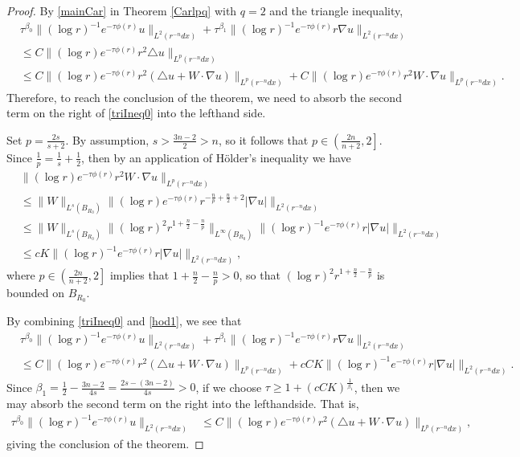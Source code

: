 \documentclass[11pt]{amsart}
\theoremstyle{plain}
\numberwithin{equation}{section}
\begin{document}
\begin{proof}
By \eqref{mainCar} in Theorem \ref{Carlpq} with $q = 2$ and the triangle inequality,
\begin{align}
&\tau^{{\beta}_0} \|(\log r)^{-1} e^{-\tau \phi(r)}u\|_{L^2(r^{-n}dx)}
+\tau^{{\beta}_1} \|(\log r )^{-1} e^{-\tau \phi(r)}r \nabla u\|_{L^2(r^{-n}dx)} \nonumber \\
&\leq  C \|(\log r ) e^{-\tau \phi(r)} r^2 \triangle u\|_{L^p(r^{-n} dx)}  \nonumber \\
&\le C\|(\log r) e^{-\tau \phi(r)} r^2 (\triangle u+ W\cdot \nabla u)\|_{L^p(r^{-n} dx)}
+ C\|(\log r) e^{-\tau \phi(r)} r^2 W\cdot \nabla u \|_{L^p(r^{-n} dx)}.
\label{triIneq0}
\end{align}
Therefore, to reach the conclusion of the theorem, we need to absorb the second term on the right of \eqref{triIneq0} into the lefthand side.

Set $p = \frac{2s}{s+2}$.
By assumption, $s > \frac{3n-2}{2} > n$, so it follows that $p \in {\left( {\frac{2n}{n+2}, 2} \right] }$.
Since $\frac{1}{p}=\frac{1}{s}+\frac{1}{2}$, then by an application of H\"older's inequality we have
\begin{align}
&\|(\log r) e^{-\tau\phi(r)} r^2 W\cdot\nabla u\|_{L^p(r^{-n} dx)} \nonumber \\
&\le  \|W\|_{L^{s}{\left( {B_{R_0}} \right) }} \|(\log r) e^{-\tau \phi(r)} r^{-\frac{n}{p}+\frac{n}{2}+2}|\nabla u|\|_{L^2(r^{-n} dx)} \nonumber \\
&\le  \|W\|_{L^{s}{\left( {B_{R_0}} \right) }} \|{\left( {\log r} \right) }^2 r^{1 + \frac n 2 - \frac n p}\|_{L^{\infty}{\left( {B_{R_0}} \right) }} \|(\log r)^{-1} e^{-\tau \phi(r)} r |\nabla u|\|_{L^2(r^{-n} dx)} \nonumber \\
&\le c K \|(\log r)^{-1} e^{-\tau \phi(r)} r |\nabla u|\|_{L^2(r^{-n} dx)},
\label{hod1}
\end{align}
where $p \in {\left( {\frac{2n}{n+2}, 2} \right] }$ implies that $1 + \frac n 2 - \frac n p > 0$, so that ${\left( {\log r} \right) }^2 r^{1 + \frac n 2 - \frac n p}$ is bounded on $B_{R_0}$.

By combining \eqref{triIneq0} and \eqref{hod1}, we see that
\begin{align*}
&\tau^{{\beta}_0} \|(\log r)^{-1} e^{-\tau \phi(r)}u\|_{L^2(r^{-n}dx)}
+\tau^{{\beta}_1} \|(\log r )^{-1} e^{-\tau \phi(r)}r \nabla u\|_{L^2(r^{-n}dx)} \nonumber \\
&\le C\|(\log r) e^{-\tau \phi(r)} r^2 (\triangle u+ W\cdot \nabla u)\|_{L^p(r^{-n} dx)}
+ c C K \|(\log r)^{-1} e^{-\tau \phi(r)} r |\nabla u|\|_{L^2(r^{-n} dx)}.
\end{align*}
Since ${\beta}_1 = \frac 1 2 - \frac{3n-2}{4s} = \frac{2s - {\left( {3n-2} \right) }}{4s} > 0$, if we choose $\tau \ge 1 + {\left( {c C K} \right) }^{\frac 1 {{\beta}_1}}$, then we may absorb the second term on the right into the lefthandside.
That is,
\begin{align*}
\tau^{{\beta}_0} \|(\log r)^{-1} e^{-\tau \phi(r)}u\|_{L^2(r^{-n}dx)} 
&\le C\|(\log r) e^{-\tau \phi(r)} r^2 (\triangle u+ W\cdot \nabla u)\|_{L^p(r^{-n} dx)},
\end{align*}
giving the conclusion of the theorem.
\end{proof}
\end{document}
